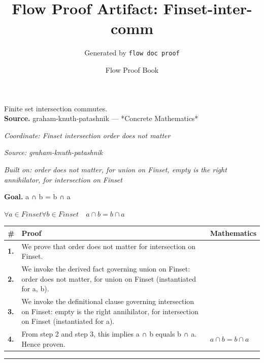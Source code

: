 \documentclass[11pt]{article}
\title{Flow Proof Artifact: Finset-inter-comm}
\author{Generated by \texttt{flow doc proof}}
\date{Flow Proof Book}
\theoremstyle{definition}
\begin{document}
\maketitle
Finite set intersection commutes.\\[0.5em]
\textbf{Source.} graham-knuth-patashnik — *Concrete Mathematics*\\[0.5em]
\bigskip
{}\par
\smallskip\noindent\textit{Coordinate: Finset \cdot intersection \cdot order does not matter}\par
\smallskip\noindent\textit{Source: graham-knuth-patashnik}\par
\smallskip\noindent\textit{Built on: order does not matter, for union on Finset, empty is the right annihilator, for intersection on Finset}\par
\medskip
\noindent\textbf{Goal.} a ∩ b = b ∩ a\par
\noindent$\displaystyle \forall a \in Finset \forall b \in Finset\quad a ∩ b = b ∩ a$\par
\medskip
\noindent
\begin{tabular}{@{} >{\raggedright\arraybackslash}p{} >{\raggedright\arraybackslash}p{} >{\raggedleft\arraybackslash}p{} @{}}
\textbf{\#} & \textbf{Proof} & \textbf{Mathematics} \\
\midrule
\textbf{1.} & We prove that order does not matter for intersection on Finset. & \\[0.45em]
\textbf{2.} & We invoke the derived fact governing union on Finset: order does not matter, for union on Finset (instantiated for a, b). & \\[0.45em]
\textbf{3.} & We invoke the definitional clause governing intersection on Finset: empty is the right annihilator, for intersection on Finset (instantiated for a). & \\[0.45em]
\textbf{4.} & From step 2 and step 3, this implies a ∩ b equals b ∩ a. Hence proven. & $\displaystyle a ∩ b = b ∩ a$ \\[0.45em]
\bottomrule
\end{tabular}
\label{thm:Finset-intersection-order_does_not_matter}
\par\medskip\hrule
\end{document}
